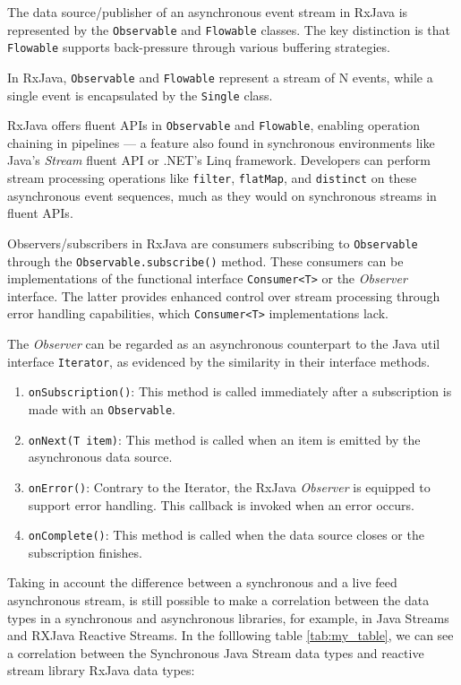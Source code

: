 The data source/publisher of an asynchronous event stream in RxJava is represented by the \texttt{Observable} and \texttt{Flowable} classes. The key distinction is that \texttt{Flowable} supports back-pressure through various buffering strategies.

In RxJava, \texttt{Observable} and \texttt{Flowable} represent a stream of N events, while a single event is encapsulated by the \texttt{Single} class.

RxJava offers fluent APIs in \texttt{Observable} and \texttt{Flowable}, enabling operation chaining in pipelines — a feature also found in synchronous environments like Java's \textit{Stream} fluent API or .NET's Linq framework. Developers can perform stream processing operations like \texttt{filter}, \texttt{flatMap}, and \texttt{distinct} on these asynchronous event sequences, much as they would on synchronous streams in fluent APIs.

Observers/subscribers in RxJava are consumers subscribing to \texttt{Observable} through the \texttt{Observable.subscribe()} method. These consumers can be implementations of the functional interface \texttt{Consumer<T>} or the \textit{Observer} interface. The latter provides enhanced control over stream processing through error handling capabilities, which \texttt{Consumer<T>} implementations lack.

The \textit{Observer} can be regarded as an asynchronous counterpart to the Java util interface \texttt{Iterator}, as evidenced by the similarity in their interface methods.
\begin{enumerate}
    \item \texttt{onSubscription()}: This method is called immediately after a subscription is made with an \texttt{Observable}.
    \item \texttt{onNext(T item)}: This method is called when an item is emitted by the asynchronous data source.
    \item \texttt{onError()}: Contrary to the Iterator, the RxJava \textit{Observer} is equipped to support error handling. This callback is invoked when an error occurs.
    \item \texttt{onComplete()}: This method is called when the data source closes or the subscription finishes.
\end{enumerate}

Taking in account the difference between a synchronous and a live feed asynchronous stream, is still possible to make a correlation between the data types in a synchronous and asynchronous libraries, for example, in Java Streams and RXJava Reactive Streams. In the folllowing table \ref{tab:my_table}, we can see a correlation between the Synchronous Java Stream data types and reactive stream library RxJava data types:


